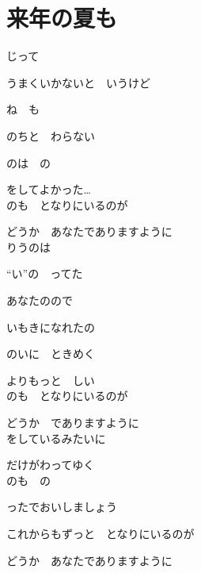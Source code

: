 \section{ 来年の夏も}
\large{

じって

うまくいかないと　いうけど

ね　も

のちと　わらない

のは　の

をしてよかった…
\\

のも　となりにいるのが

どうか　あなたでありますように
\\

りうのは

“い”の　ってた

あなたのので

いもきになれたの

のいに　ときめく

よりもっと　しい
\\

のも　となりにいるのが

どうか　でありますように
\\

をしているみたいに

だけがわってゆく
\\

のも　の

ったでおいしましょう

これからもずっと　となりにいるのが

どうか　あなたでありますように

}
